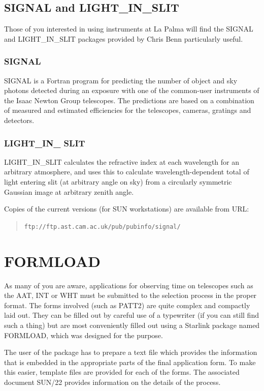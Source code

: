 \documentclass[twoside,11pt]{article}
\newcommand{\xref}[3]{#1}
\newcommand{\xlabel}[1]{}
\newcommand{\SUNFORMref}{\xref{SUN/22}{sun22}{}}
\begin{document}
\subsection{SIGNAL and LIGHT\_IN\_SLIT} \xlabel{SIGNAL}
\label{sec:signal}
Those of you interested in using instruments at La Palma will find the SIGNAL and
LIGHT\_IN\_SLIT packages provided by Chris Benn particularly useful.

\subsubsection{SIGNAL}

SIGNAL is a Fortran program for predicting the number of object and sky
photons detected during an exposure with one of the common-user instruments
of the Isaac Newton Group telescopes. The predictions are based on a
combination of measured and estimated efficiencies for the telescopes,
cameras, gratings and detectors.

\subsubsection{LIGHT\_IN\_ SLIT}

LIGHT\_IN\_SLIT calculates the refractive index at each wavelength for an
arbitrary atmosphere, and uses this to calculate wavelength-dependent total of
light entering slit (at arbitrary angle on sky) from a circularly symmetric
Gaussian image at arbitrary zenith angle.

Copies of the current versions (for SUN workstations) are available
from URL:
\begin{quote}
{\tt ftp://ftp.ast.cam.ac.uk/pub/pubinfo/signal/}
\end{quote}

\section{FORMLOAD} \xlabel{FORMLOAD}
\label{sec:formload}

As many of you are aware, applications for observing time on
telescopes such as the AAT, INT or WHT must be submitted to the
selection process in the proper format. The forms involved (such as PATT2)
are quite complex and compactly laid out. They can be filled out by careful
use of a typewriter (if you can still find such a thing) but are most
conveniently filled out using a Starlink package named FORMLOAD, which was
designed for the purpose.

The user of the package has to prepare a text file which provides the
information that is embedded in the appropriate parts of the final
application form. To make this easier, template files are provided for each
of the forms. The associated document {\SUNFORMref} provides information
on the details of the process.
\end{document}
